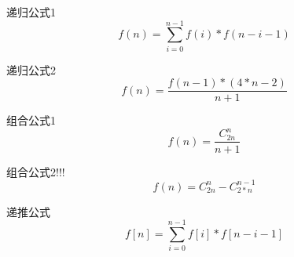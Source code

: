 递归公式1
\begin{displaymath}
f(n)=\sum_{i=0}^{n-1}f(i)*f(n-i-1)
\end{displaymath}

递归公式2
\begin{displaymath}
f(n)=\frac{f(n-1)*(4*n-2)}{n+1}
\end{displaymath}

组合公式1
\begin{displaymath}
f(n)=\frac{C_{2n}^n}{n+1}
\end{displaymath}

组合公式2!!!
\begin{displaymath}
f(n)=C_{2n}^n-C_{2*n}^{n-1}
\end{displaymath}

递推公式
\begin{displaymath}
f[n]=\sum_{i=0}^{n-1}f[i]*f[n-i-1]
\end{displaymath}